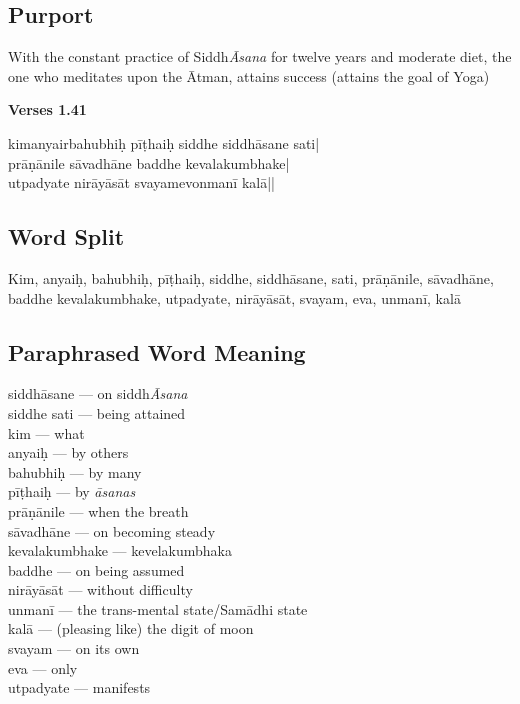 \subsection*{Purport}

With the constant practice of Siddh\textit{Āsana} for twelve years and moderate diet, the one who meditates upon the Ātman,  attains success (attains the goal of Yoga)

\newpage
\noindent \textbf{Verses 1.41}

\begin{shloka}
kimanyairbahubhiḥ pīṭhaiḥ siddhe siddhāsane sati|\\
prāṇānile sāvadhāne baddhe kevalakumbhake|\\
utpadyate nirāyāsāt svayamevonmanī kalā||
\end{shloka}

\subsection*{Word Split}

Kim, anyaiḥ, bahubhiḥ, pīṭhaiḥ, siddhe, siddhāsane, sati, prāṇānile, sāvadhāne, baddhe kevalakumbhake, utpadyate, nirāyāsāt, svayam, eva, unmanī,  kalā 

\subsection*{Paraphrased Word Meaning}

\begin{multicols}{2}
\itemsep=0pt
siddhāsane ---  on siddh\textit{Āsana}  \\
siddhe sati --- being attained   \\
kim --- what   \\
anyaiḥ --- by others   \\
bahubhiḥ --- by many  \\
pīṭhaiḥ ---  by \textit{āsanas} \\
prāṇānile ---	when the breath\\
sāvadhāne ---  on becoming steady	 \\
kevalakumbhake --- kevelakumbhaka  \\
baddhe ---  on being assumed \\
nirāyāsāt --- without difficulty  \\
unmanī ---  the trans-mental state/Samādhi state \\
kalā --- (pleasing like) the digit of moon  \\
svayam --- on its own \\
eva --- only  \\
utpadyate --- manifests
\end{multicols}

